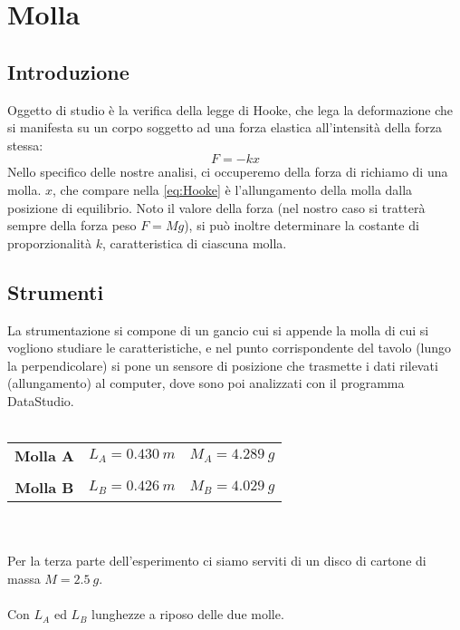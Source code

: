 
\chapter{Molla}

\section{Introduzione}
Oggetto di studio è la verifica della legge di Hooke, che lega la deformazione che si manifesta su un corpo soggetto ad una forza elastica all'intensità della forza stessa:
\begin{equation}\label{eq:Hooke}
F=-kx
\end{equation}
Nello specifico delle nostre analisi, ci occuperemo della forza di richiamo di una molla. $x$, che compare nella \ref{eq:Hooke} è l'allungamento della molla dalla posizione di equilibrio.
Noto il valore della forza (nel nostro caso si tratterà sempre della forza peso $F=Mg$), si può inoltre determinare la costante di proporzionalità $k$, caratteristica di ciascuna molla.

\section{Strumenti}
La strumentazione si compone di un gancio cui si appende la molla di cui si vogliono studiare le caratteristiche, e nel punto corrispondente del tavolo (lungo la perpendicolare) si pone un sensore di posizione che trasmette i dati rilevati (allungamento) al computer, dove sono poi analizzati con il programma DataStudio.\\
\\
\begin{tabular}{c c c}
\textbf{Molla A} & \hspace{1.5cm} $L_A=0.430\ m$ & \hspace{1.5cm} $M_A=4.289\ g$\\
\\
\textbf{Molla B} & \hspace{1.5cm} $L_B=0.426\ m$ & \hspace{1.5cm} $M_B=4.029\ g$\\
\end{tabular}
\\
\\
Per la terza parte dell'esperimento ci siamo serviti di un disco di cartone di massa $M=2.5\ g$. 
\\
\\
Con $L_A$ ed $L_B$ lunghezze a riposo delle due molle.

